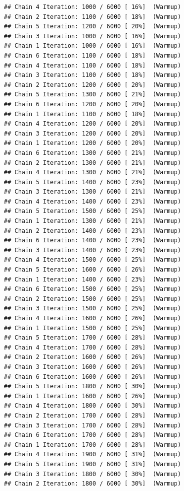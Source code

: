 \documentclass[
]{article}
\begin{document}
\begin{verbatim}
## Chain 4 Iteration: 1000 / 6000 [ 16%]  (Warmup) 
## Chain 2 Iteration: 1100 / 6000 [ 18%]  (Warmup) 
## Chain 5 Iteration: 1200 / 6000 [ 20%]  (Warmup) 
## Chain 3 Iteration: 1000 / 6000 [ 16%]  (Warmup) 
## Chain 1 Iteration: 1000 / 6000 [ 16%]  (Warmup) 
## Chain 6 Iteration: 1100 / 6000 [ 18%]  (Warmup) 
## Chain 4 Iteration: 1100 / 6000 [ 18%]  (Warmup) 
## Chain 3 Iteration: 1100 / 6000 [ 18%]  (Warmup) 
## Chain 2 Iteration: 1200 / 6000 [ 20%]  (Warmup) 
## Chain 5 Iteration: 1300 / 6000 [ 21%]  (Warmup) 
## Chain 6 Iteration: 1200 / 6000 [ 20%]  (Warmup) 
## Chain 1 Iteration: 1100 / 6000 [ 18%]  (Warmup) 
## Chain 4 Iteration: 1200 / 6000 [ 20%]  (Warmup) 
## Chain 3 Iteration: 1200 / 6000 [ 20%]  (Warmup) 
## Chain 1 Iteration: 1200 / 6000 [ 20%]  (Warmup) 
## Chain 6 Iteration: 1300 / 6000 [ 21%]  (Warmup) 
## Chain 2 Iteration: 1300 / 6000 [ 21%]  (Warmup) 
## Chain 4 Iteration: 1300 / 6000 [ 21%]  (Warmup) 
## Chain 5 Iteration: 1400 / 6000 [ 23%]  (Warmup) 
## Chain 3 Iteration: 1300 / 6000 [ 21%]  (Warmup) 
## Chain 4 Iteration: 1400 / 6000 [ 23%]  (Warmup) 
## Chain 5 Iteration: 1500 / 6000 [ 25%]  (Warmup) 
## Chain 1 Iteration: 1300 / 6000 [ 21%]  (Warmup) 
## Chain 2 Iteration: 1400 / 6000 [ 23%]  (Warmup) 
## Chain 6 Iteration: 1400 / 6000 [ 23%]  (Warmup) 
## Chain 3 Iteration: 1400 / 6000 [ 23%]  (Warmup) 
## Chain 4 Iteration: 1500 / 6000 [ 25%]  (Warmup) 
## Chain 5 Iteration: 1600 / 6000 [ 26%]  (Warmup) 
## Chain 1 Iteration: 1400 / 6000 [ 23%]  (Warmup) 
## Chain 6 Iteration: 1500 / 6000 [ 25%]  (Warmup) 
## Chain 2 Iteration: 1500 / 6000 [ 25%]  (Warmup) 
## Chain 3 Iteration: 1500 / 6000 [ 25%]  (Warmup) 
## Chain 4 Iteration: 1600 / 6000 [ 26%]  (Warmup) 
## Chain 1 Iteration: 1500 / 6000 [ 25%]  (Warmup) 
## Chain 5 Iteration: 1700 / 6000 [ 28%]  (Warmup) 
## Chain 4 Iteration: 1700 / 6000 [ 28%]  (Warmup) 
## Chain 2 Iteration: 1600 / 6000 [ 26%]  (Warmup) 
## Chain 3 Iteration: 1600 / 6000 [ 26%]  (Warmup) 
## Chain 6 Iteration: 1600 / 6000 [ 26%]  (Warmup) 
## Chain 5 Iteration: 1800 / 6000 [ 30%]  (Warmup) 
## Chain 1 Iteration: 1600 / 6000 [ 26%]  (Warmup) 
## Chain 4 Iteration: 1800 / 6000 [ 30%]  (Warmup) 
## Chain 2 Iteration: 1700 / 6000 [ 28%]  (Warmup) 
## Chain 3 Iteration: 1700 / 6000 [ 28%]  (Warmup) 
## Chain 6 Iteration: 1700 / 6000 [ 28%]  (Warmup) 
## Chain 1 Iteration: 1700 / 6000 [ 28%]  (Warmup) 
## Chain 4 Iteration: 1900 / 6000 [ 31%]  (Warmup) 
## Chain 5 Iteration: 1900 / 6000 [ 31%]  (Warmup) 
## Chain 3 Iteration: 1800 / 6000 [ 30%]  (Warmup) 
## Chain 2 Iteration: 1800 / 6000 [ 30%]  (Warmup) 

\end{verbatim}
\end{document}
